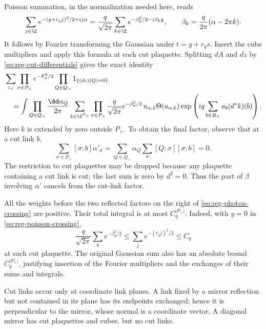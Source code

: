 Poisson summation, in the normalization needed here, reads
\begin{equation}\label{eq:reg-poisson-crossing}
 \sum_{j\in\Z}e^{-(y+r_qj)^2/2+ij\alpha}
 =\frac{q}{\sqrt{2\pi}}\sum_{k\in\Z}
          e^{-\beta_k^2/2-i\beta_ky},
 \qquad\beta_k=\frac{q}{2\pi}(\alpha-2\pi k).
\end{equation}
It follows by Fourier transforming the Gaussian under
$t=y+r_qs$. Insert the cube multipliers and apply this formula at
each cut plaquette. Splitting $dA$ and $dz$ by
\eqref{eq:reg-cut-differentials} gives the exact identity
\begin{align}\label{eq:reg-photon-crossing}
 &\sum_{z_\times}
       \prod_{\sigma\in P_\times}e^{-F_\sigma^2/2}
       \prod_{Q\in Q_\times}1_{\{(dz)(Q)=0\}}
 \nonumber\\
 &\quad=\int\prod_{Q\in Q_\times}\frac{\dd\alpha_Q}{2\pi}
       \sum_{k\in\Z^{P_\times}}
       \prod_{\sigma\in P_\times}
               \frac{q}{\sqrt{2\pi}}e^{-\beta_\sigma^2/2}\,
       u_{\alpha,k}\Theta(u_{\alpha,k})
       \exp\left(iq\sum_{b\in B_\times}a_b(d^*k)(b)\right).
\end{align}
Here $k$ is extended by zero outside $P_\times$. To obtain the final
factor, observe that at a cut link $b$,
\[
 \sum_{\sigma\in P_\times}[\sigma:b]\alpha'_\sigma
 =\sum_{Q\in Q_\times}\alpha_Q
                    \sum_\sigma[Q:\sigma][\sigma:b]=0.
\]
The restriction to cut plaquettes may be dropped because any
plaquette containing a cut link is cut; the last sum is zero by
$d^2=0$. Thus the part of $\beta$ involving $\alpha'$ cancels from
the cut-link factor.

All the weights before the two reflected factors on the right of
\eqref{eq:reg-photon-crossing} are positive. Their total integral is
at most $C_q^{|P_\times|}$. Indeed, with $y=0$ in
\eqref{eq:reg-poisson-crossing},
\[
 \frac{q}{\sqrt{2\pi}}\sum_k e^{-\beta_k^2/2}
 \le\sum_j e^{-(r_qj)^2/2}\le C_q
\]
at each cut plaquette. The original Gaussian sum also has an
absolute bound $C_q^{|P_\times|}$, justifying insertion of the
Fourier multipliers and the exchanges of their sums and integrals.

Cut links occur only at coordinate link planes. A link fixed by a
mirror reflection but not contained in its plane has its endpoints
exchanged; hence it is perpendicular to the mirror, whose normal
is a coordinate vector. A diagonal mirror has cut plaquettes and
cubes, but no cut links.

